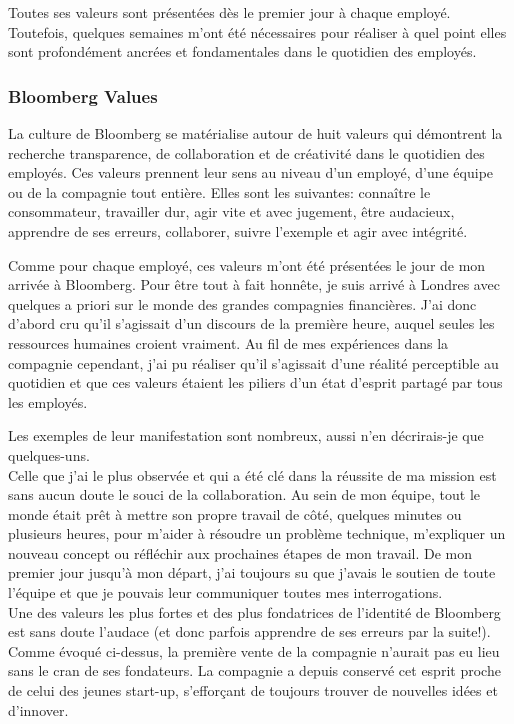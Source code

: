 \documentclass[11pt, oneside, titlepage, a4paper]{article}
\begin{document}
Toutes ses valeurs sont présentées dès le premier jour à chaque employé. Toutefois, quelques semaines m'ont été nécessaires pour réaliser à quel point elles sont profondément ancrées et fondamentales dans le quotidien des employés.
		\subsubsection{Bloomberg Values} \label{values}
La culture de Bloomberg se matérialise autour de huit valeurs qui démontrent la recherche transparence, de collaboration et de créativité dans le quotidien des employés. Ces valeurs prennent leur sens au niveau d'un employé, d'une équipe ou de la compagnie tout entière. Elles sont les suivantes: connaître le consommateur, travailler dur, agir vite et avec jugement, être audacieux, apprendre de ses erreurs, collaborer, suivre l'exemple et agir avec intégrité.

Comme pour chaque employé, ces valeurs m'ont été présentées le jour de mon arrivée à Bloomberg. Pour être tout à fait honnête, je suis arrivé à Londres avec quelques a priori sur le monde des grandes compagnies financières. J'ai donc d'abord cru qu'il s'agissait d'un discours de la première heure, auquel seules les ressources humaines croient vraiment. Au fil de mes expériences dans la compagnie cependant, j'ai pu réaliser qu'il s'agissait d'une réalité perceptible au quotidien et que ces valeurs étaient les piliers d'un état d'esprit partagé par tous les employés.

Les exemples de leur manifestation sont nombreux, aussi n'en décrirais-je que quelques-uns.
\\

Celle que j'ai le plus observée et qui a été clé dans la réussite de ma mission est sans aucun doute le souci de la collaboration. Au sein de mon équipe, tout le monde était prêt à mettre son propre travail de côté, quelques minutes ou plusieurs heures, pour m'aider à résoudre un problème technique, m'expliquer un nouveau concept ou réfléchir aux prochaines étapes de mon travail. De mon premier jour jusqu'à mon départ, j'ai toujours su que j'avais le soutien de toute l'équipe et que je pouvais leur communiquer toutes mes interrogations.
\\

Une des valeurs les plus fortes et des plus fondatrices de l'identité de Bloomberg est sans doute l'audace (et donc parfois apprendre de ses erreurs par la suite!). Comme évoqué ci-dessus, la première vente de la compagnie n'aurait pas eu lieu sans le cran de ses fondateurs. La compagnie a depuis conservé cet esprit proche de celui des jeunes start-up, s'efforçant de toujours trouver de nouvelles idées et d'innover.
\\
\end{document}
